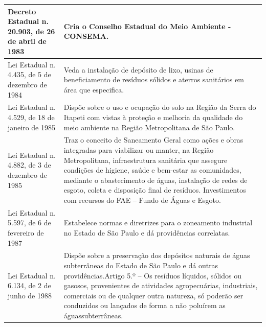 \begin{center}
\begin{longtable}{|p{}|p{}|}
			\hline
			Decreto Estadual n. 20.903, de 26 de abril de 1983 & Cria o Conselho Estadual do Meio Ambiente - CONSEMA. \\
			\hline
			Lei Estadual n. 4.435, de 5 de dezembro de 1984 & Veda  a  instalação  de  depósito  de  lixo,  usinas  de  beneficiamento  de  resíduos sólidos e aterros sanitários em área que especifica. \\
			\hline
			Lei Estadual n. 4.529, de 18 de janeiro de 1985 & Dispõe  sobre  o  uso  e  ocupação  do  solo  na  Região  da  Serra  do  Itapeti  com vistas  à  proteção  e  melhoria  da  qualidade  do  meio  ambiente  na  Região Metropolitana de São Paulo. \\
			\hline
			Lei Estadual n. 4.882, de 3 de dezembro de 1985 & Traz  o  conceito  de  Saneamento  Geral  como  ações  e  obras  integradas  para viabilizar  ou   manter,  na   Região   Metropolitana,  infraestrutura  sanitária   que assegure condições de higiene, saúde e bem-estar as comunidades, mediante o abastecimento  de  águas,  instalação  de  redes  de  esgoto,  coleta  e  disposição final  de  resíduos.  Investimentos  com  recursos  do  FAE  –  Fundo  de  Águas  e Esgoto. \\
			\hline
			Lei Estadual n. 5.597, de 6 de fevereiro de 1987 & Estabelece normas e diretrizes para o zoneamento industrial no Estado de São Paulo e dá providências correlatas. \\
			\hline
			Lei Estadual n. 6.134, de 2 de junho de 1988 & Dispõe sobre a preservação dos depósitos naturais de águas subterrâneas do Estado de São Paulo e dá outras providências.\newline{}Artigo 5.º – Os resíduos líquidos, sólidos ou gasosos, provenientes de atividades agropecuárias,   industriais,   comerciais   ou   de   qualquer   outra   natureza,   só poderão  ser  conduzidos  ou  lançados  de  forma  a  não  poluírem  as  águas\newline{}subterrâneas. \\
			\hline

\end{longtable}
\end{center}
